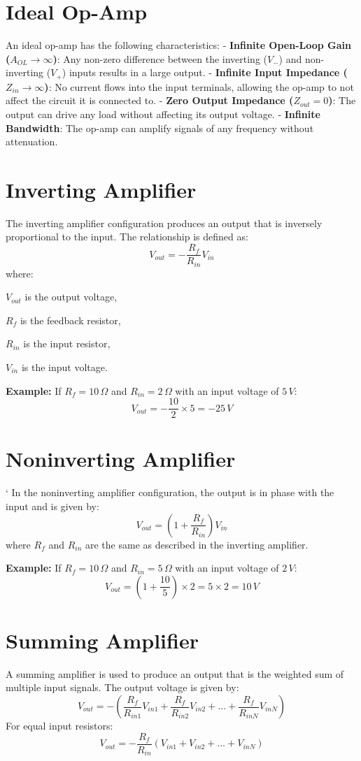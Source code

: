\documentclass[openany]{book}
\begin{document}
\section{Ideal Op-Amp}
An ideal op-amp has the following characteristics:
- \textbf{Infinite Open-Loop Gain ($A_{OL} \to \infty$)}: Any non-zero difference between the inverting ($V_-$) and non-inverting ($V_+$) inputs results in a large output.
- \textbf{Infinite Input Impedance ($Z_{in} \to \infty$)}: No current flows into the input terminals, allowing the op-amp to not affect the circuit it is connected to.
- \textbf{Zero Output Impedance ($Z_{out} = 0$)}: The output can drive any load without affecting its output voltage.
- \textbf{Infinite Bandwidth}: The op-amp can amplify signals of any frequency without attenuation.

\section{Inverting Amplifier}
The inverting amplifier configuration produces an output that is inversely proportional to the input. The relationship is defined as:
\[
V_{out} = -\frac{R_f}{R_{in}} V_{in}
\]
where:

 \(V_{out}\) is the output voltage,
 
 \(R_f\) is the feedback resistor,
 
 \(R_{in}\) is the input resistor,
 
 \(V_{in}\) is the input voltage.

\textbf{Example:} If \(R_f = 10 \, \Omega\) and \(R_{in} = 2 \, \Omega\) with an input voltage of \(5 \, V\):
\[
V_{out} = -\frac{10}{2} \times 5 = -25 \, V
\]

\section{Noninverting Amplifier}`
In the noninverting amplifier configuration, the output is in phase with the input and is given by:
\[
V_{out} = \left(1 + \frac{R_f}{R_{in}}\right) V_{in}
\]
where \(R_f\) and \(R_{in}\) are the same as described in the inverting amplifier.

\textbf{Example:} If \(R_f = 10 \, \Omega\) and \(R_{in} = 5 \, \Omega\) with an input voltage of \(2 \, V\):
\[
V_{out} = \left(1 + \frac{10}{5}\right) \times 2 = 5 \times 2 = 10 \, V
\]

\section{Summing Amplifier}
A summing amplifier is used to produce an output that is the weighted sum of multiple input signals. The output voltage is given by:
\[
V_{out} = -\left(\frac{R_f}{R_{in1}} V_{in1} + \frac{R_f}{R_{in2}} V_{in2} + \ldots + \frac{R_f}{R_{inN}} V_{inN}\right)
\]
For equal input resistors:
\[
V_{out} = -\frac{R_f}{R_{in}} (V_{in1} + V_{in2} + \ldots + V_{inN})
\]
\end{document}
